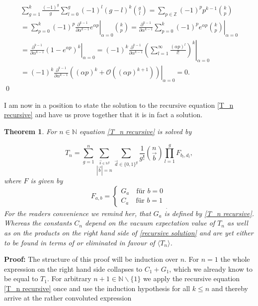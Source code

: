 \documentclass[b5paper,draft,openbib,12pt]{memoir}
\newtheorem{Thm}[Def]{Theorem}
\begin{document}
\begin{multline*}
\sum_{g=1}^k \frac{(-1)^g}{g} \sum_{l=0}^g (-1)^l (g-l)^k \binom{g}{l}
=\sum_{p\in\mathbb{Z}} (-1)^{p} p^{k-1}  \binom{k}{p}\\
=\sum_{p=0}^k (-1)^{p} \left. \frac{\partial^{k-1}}{\partial \alpha^{k-1}} e^{\alpha p}\right|_{\alpha=0}  \binom{k}{p}
=\left. \frac{\partial^{k-1}}{\partial \alpha^{k-1}}  \sum_{p=0}^k (-1)^{p} e^{\alpha p} \binom{k}{p}\right|_{\alpha=0} \\
=\left. \frac{\partial^{k-1}}{\partial \alpha^{k-1}}  \left( 1-e^{\alpha p}\right)^k \right|_{\alpha=0} 
=(-1)^k \left. \frac{\partial^{k-1}}{\partial \alpha^{k-1}} \left( \sum_{l=1}^\infty \frac{(\alpha p)^l}{l!} \right) ^k \right|_{\alpha=0} \\
=(-1)^k \left. \frac{\partial^{k-1}}{\partial \alpha^{k-1}} ((\alpha p)^k + \mathcal{O} ((\alpha p)^{k+1}) ) \right|_{\alpha=0} =0.
\end{multline*}
\qed




I am now in a position to state the solution to the recursive equation \eqref{T_n recursive}
and have us prove together that it is in fact a solution. 

\begin{Thm}
For \(n\in\mathbb{N}\) equation \eqref{T_n recursive} is solved by 

\begin{equation}\label{recursive solution}
T_n = \sum_{g=1}^n \sum_{\stackrel{\vec{b}\in\mathbb{N}^g}{|\vec{b}|= n}} \sum_{\vec{d}\in {\{0,1\}}^g} 
\frac{1}{g!} \binom{n}{\vec{b}} \prod_{l=1}^g F_{b_l,d_l},
\end{equation}
where \(F\) is given by
\begin{equation}\label{eq resursive weak solution}
F_{a,b} = \left\{ \begin{matrix}G_a \quad \text{für } b=0 \\ C_a \quad \text{für } b=1  \end{matrix} \right._. 
\end{equation}
For the readers convenience we remind her, that \(G_a\) is defined by \eqref{T_n recursive}. Whereas
the constants \(C_n\) depend on the vacuum expectation value of \(T_n\) as well as on the products
on the right hand side of \eqref{recursive solution} and are yet either to be found in terms of or 
eliminated in favour of \(\langle T_n \rangle \). 
\end{Thm}

\textbf{Proof:} The structure of this proof will be induction over \(n\). For \(n=1\) the whole expression
on the right hand side collapses to \(C_1 + G_1\), which we already know to be equal to \(T_1\). For
arbitrary \(n+1\in\mathbb{N}\backslash\{1\}\) we apply the recursive equation \eqref{T_n recursive}
once and use the induction hypothesis for all \(k\le n\) and thereby arrive at the rather convoluted 
expression
\end{document}
